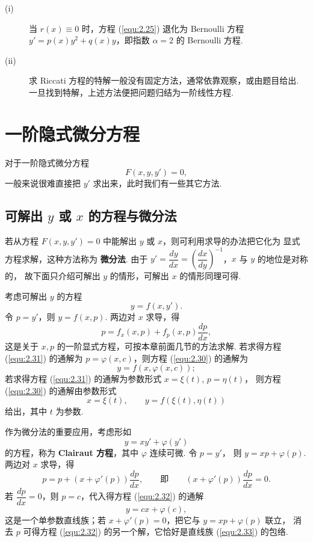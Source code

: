 \begin{rmk}
\begin{description}
\item[(i)] 当 $r(x)\equiv0$ 时，方程 (\ref{equ:2.25}) 退化为 Bernoulli 方程
$y'=p(x)y^2+q(x)y$，即指数 $\alpha=2$ 的 Bernoulli 方程.
\item[(ii)] 求 Riccati 方程的特解一般没有固定方法，通常依靠观察，或由题目给出.
一旦找到特解，上述方法便把问题归结为一阶线性方程.
\end{description}
\end{rmk}


\section{一阶隐式微分方程}\label{sec:2.5}
对于一阶隐式微分方程
\begin{equation}
F(x,y,y')=0,
\end{equation}
一般来说很难直接把 $y'$ 求出来，此时我们有一些其它方法.

\subsection{可解出 $y$ 或 $x$ 的方程与微分法}
若从方程 $F(x,y,y')=0$ 中能解出 $y$ 或 $x$，则可利用求导的办法把它化为
显式方程求解，这种方法称为 \textbf{微分法}. 由于
$y'=\dfrac{dy}{dx}=\left(\dfrac{dx}{dy}\right)^{-1}$，$x$ 与 $y$ 的地位是对称的，
故下面只介绍可解出 $y$ 的情形，可解出 $x$ 的情形同理可得.

考虑可解出 $y$ 的方程
\begin{equation}\label{equ:2.30}
y=f(x,y').
\end{equation}
令 $p=y'$，则 $y=f(x,p)$. 两边对 $x$ 求导，得
\begin{equation}\label{equ:2.31}
p=f_x(x,p)+f_p(x,p)\frac{dp}{dx},
\end{equation}
这是关于 $x,p$ 的一阶显式方程，可按本章前面几节的方法求解. 若求得方程
(\ref{equ:2.31}) 的通解为 $p=\varphi(x,c)$，则方程 (\ref{equ:2.30}) 的通解为
\[
y=f(x,\varphi(x,c));
\]
若求得方程 (\ref{equ:2.31}) 的通解为参数形式 $x=\xi(t)$, $p=\eta(t)$，
则方程 (\ref{equ:2.30}) 的通解由参数形式
\[
x=\xi(t),\qquad y=f(\xi(t),\eta(t))
\]
给出，其中 $t$ 为参数.

作为微分法的重要应用，考虑形如
\begin{equation}\label{equ:2.32}
y=xy'+\varphi(y')
\end{equation}
的方程，称为 \textbf{Clairaut 方程}，其中 $\varphi$ 连续可微. 令 $p=y'$，
则 $y=xp+\varphi(p)$. 两边对 $x$ 求导，得
\[
p=p+\left(x+\varphi'(p)\right)\frac{dp}{dx},
\qquad\text{即}\qquad
\left(x+\varphi'(p)\right)\frac{dp}{dx}=0.
\]
若 $\dfrac{dp}{dx}=0$，则 $p=c$，代入得方程 (\ref{equ:2.32}) 的通解
\begin{equation}\label{equ:2.33}
y=cx+\varphi(c),
\end{equation}
这是一个单参数直线族；若 $x+\varphi'(p)=0$，把它与 $y=xp+\varphi(p)$ 联立，
消去 $p$ 可得方程 (\ref{equ:2.32}) 的另一个解，它恰好是直线族 (\ref{equ:2.33})
的包络.

